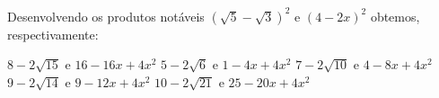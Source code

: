 Desenvolvendo os produtos notáveis $(\sqrt{5}-\sqrt{3})^2$ e $(4-2x)^2$ obtemos, respectivamente:

$8-2\sqrt{15}$ e $16-16x+4x^2$
$5-2\sqrt{6}$ e $1-4x+4x^2$
$7-2\sqrt{10}$ e $4-8x+4x^2$
$9-2\sqrt{14}$ e $9-12x+4x^2$
$10-2\sqrt{21}$ e $25-20x+4x^2$


